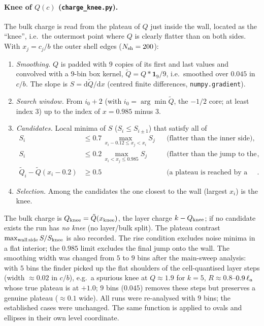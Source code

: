 \paragraph{Knee of $Q(c)$ (\texttt{charge\_knee.py}).}
The bulk charge is read from the plateau of $Q$ just inside the wall, located as the
``knee'', i.e.\ the outermost point where $Q$ is clearly flatter than on both sides.
With $x_j=c_j/b$ the outer shell edges ($N_{\rm sh}=200$):
\begin{enumerate}
  \item \emph{Smoothing.} $Q$ is padded with $9$ copies of its first and last values and
        convolved with a $9$-bin box kernel, $\tilde Q = Q * \mathbf{1}_9/9$, i.e.\ smoothed over
        $0.045$ in $c/b$. The slope is $S=\mathrm{d}\tilde Q/\mathrm{d}x$ (centred finite differences,
        \texttt{numpy.gradient}).
  \item \emph{Search window.} From $i_0+2$ (with $i_0=\arg\min\tilde Q$, the $-1/2$ core; at least
        index 3) up to the index of $x=0.985$ minus 3.
  \item \emph{Candidates.} Local minima of $S$ ($S_i\le S_{i\pm1}$) that satisfy all of
        \begin{align}
          S_i &\le 0.7\, \max_{x_i-0.12\le x_j< x_i} S_j &&\text{(flatter than the inner side)},\\
          S_i &\le 0.2\, \max_{x_i< x_j\le 0.985} S_j &&\text{(flatter than the jump to the wall)},\\
          \tilde Q_i - \tilde Q(x_i-0.2) &\ge 0.5 &&\text{(a plateau is reached by a rise)} .
        \end{align}
  \item \emph{Selection.} Among the candidates the one closest to the wall (largest $x_i$) is the knee.
\end{enumerate}
The bulk charge is $Q_{\rm knee}=\tilde Q(x_{\rm knee})$, the layer charge $k-Q_{\rm knee}$; if no
candidate exists the run has \emph{no knee} (no layer/bulk split). The plateau contrast
$\max_{\rm wall\,side}S/S_{\rm knee}$ is also recorded. The rise condition excludes noise minima in
a flat interior; the $0.985$ limit excludes the final jump onto the wall.
The smoothing width was changed from $5$ to $9$ bins after the main-sweep analysis: with $5$ bins
the finder picked up the flat shoulders of the cell-quantised layer steps (width $\approx0.02$ in
$c/b$), e.g.\ a spurious knee at $Q\approx1.9$ for $k=5$, $R\approx0.8$--$0.9\,\ell_a$ whose true plateau is
at $+1.0$; $9$ bins ($0.045$) removes these steps but preserves a genuine plateau
($\approx0.1$ wide). All runs were re-analysed with $9$ bins; the established cases were unchanged.
The same function is applied to ovals and ellipses in their own level coordinate.

